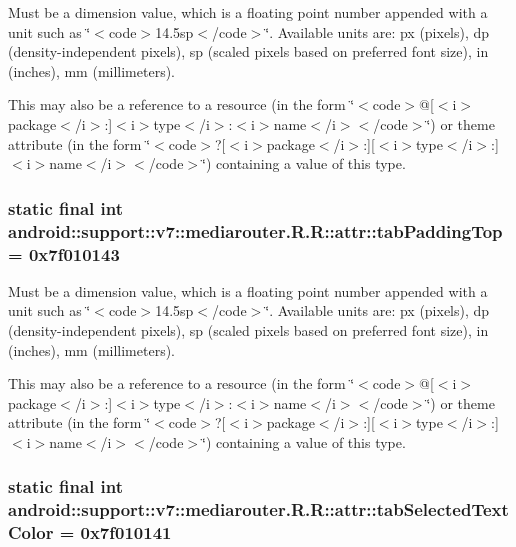 Must be a dimension value, which is a floating point number appended with a unit such as \char`\"{}$<$code$>$14.5sp$<$/code$>$\char`\"{}. Available units are: px (pixels), dp (density-independent pixels), sp (scaled pixels based on preferred font size), in (inches), mm (millimeters). 

This may also be a reference to a resource (in the form \char`\"{}$<$code$>$@\mbox{[}$<$i$>$package$<$/i$>$:\mbox{]}$<$i$>$type$<$/i$>$:$<$i$>$name$<$/i$>$$<$/code$>$\char`\"{}) or theme attribute (in the form \char`\"{}$<$code$>$?\mbox{[}$<$i$>$package$<$/i$>$:\mbox{]}\mbox{[}$<$i$>$type$<$/i$>$:\mbox{]}$<$i$>$name$<$/i$>$$<$/code$>$\char`\"{}) containing a value of this type. \hypertarget{classandroid_1_1support_1_1v7_1_1mediarouter_1_1_r_1_1attr_306b8efff22bcaadd30e727df30db94f}{
\subsubsection[{tabPaddingTop}]{\setlength{\rightskip}{0pt plus 5cm}static final int android::support::v7::mediarouter.R.R::attr::tabPaddingTop = 0x7f010143}}
\label{classandroid_1_1support_1_1v7_1_1mediarouter_1_1_r_1_1attr_306b8efff22bcaadd30e727df30db94f}


Must be a dimension value, which is a floating point number appended with a unit such as \char`\"{}$<$code$>$14.5sp$<$/code$>$\char`\"{}. Available units are: px (pixels), dp (density-independent pixels), sp (scaled pixels based on preferred font size), in (inches), mm (millimeters). 

This may also be a reference to a resource (in the form \char`\"{}$<$code$>$@\mbox{[}$<$i$>$package$<$/i$>$:\mbox{]}$<$i$>$type$<$/i$>$:$<$i$>$name$<$/i$>$$<$/code$>$\char`\"{}) or theme attribute (in the form \char`\"{}$<$code$>$?\mbox{[}$<$i$>$package$<$/i$>$:\mbox{]}\mbox{[}$<$i$>$type$<$/i$>$:\mbox{]}$<$i$>$name$<$/i$>$$<$/code$>$\char`\"{}) containing a value of this type. \hypertarget{classandroid_1_1support_1_1v7_1_1mediarouter_1_1_r_1_1attr_1c5501ec7a96046c3004d71813fc98ea}{
\subsubsection[{tabSelectedTextColor}]{\setlength{\rightskip}{0pt plus 5cm}static final int android::support::v7::mediarouter.R.R::attr::tabSelectedTextColor = 0x7f010141}}
\label{classandroid_1_1support_1_1v7_1_1mediarouter_1_1_r_1_1attr_1c5501ec7a96046c3004d71813fc98ea}


